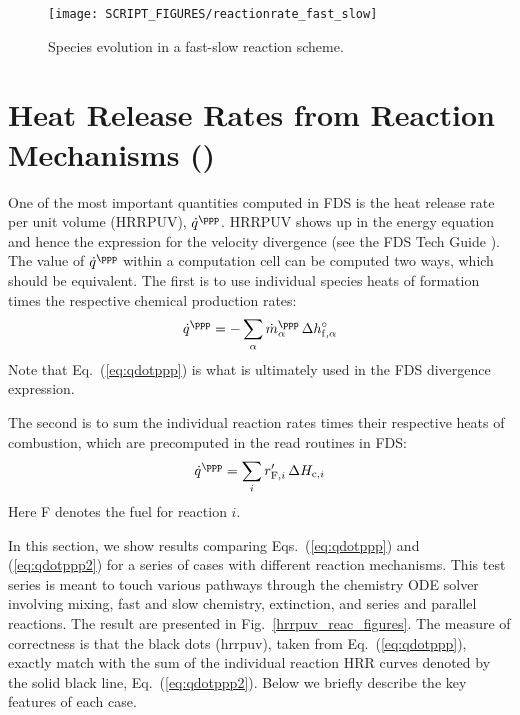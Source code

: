 \documentclass[11pt]{book}
\begin{document}
\begin{figure}[!ht]
\centering
\texttt{[image: SCRIPT\_FIGURES/reactionrate\_fast\_slow]}
\caption[Species evolution in a fast-slow reaction scheme]{Species evolution in a fast-slow reaction scheme.}
\label{fig:reactionrate_fast_slow}
\end{figure}

\FloatBarrier


\section{Heat Release Rates from Reaction Mechanisms ()}
\label{hrrpuv_reac}
\label{hrrpuv_reac_arrhenius}
\label{hrrpuv_reac_extinction}
\label{hrrpuv_reac_parallel}
\label{hrrpuv_reac_parallel_2}
\label{hrrpuv_reac_series}
\label{hrrpuv_reac_simple}
\label{hrrpuv_reac_single}
\label{hrrpuv_reac_soot}

One of the most important quantities computed in FDS is the heat release rate per unit volume (HRRPUV), $\dot{q}^{\ppp}$.  HRRPUV shows up in the energy equation and hence the expression for the velocity divergence (see the FDS Tech Guide \cite{FDS_Math_Guide}).  The value of $\dot{q}^{\ppp}$ within a computation cell can be computed two ways, which should be equivalent.  The first is to use individual species heats of formation times the respective chemical production rates:
\begin{equation}
\label{eq:qdotppp}
\dot{q}^{\ppp} = - \sum_\alpha \dot{m}_\alpha^{\ppp} \, \Delta h_{{\rm f},\alpha}^\circ
\end{equation}
Note that Eq.~(\ref{eq:qdotppp}) is what is ultimately used in the FDS divergence expression.

The second is to sum the individual reaction rates  times their respective heats of combustion, which are precomputed in the read routines in FDS:
\begin{equation}
\label{eq:qdotppp2}
\dot{q}^{\ppp} = \sum_i r_{{\rm F},i}^\prime \, \Delta H_{{\rm c},i}
\end{equation}
Here F denotes the fuel for reaction $i$.

In this section, we show results comparing Eqs.~(\ref{eq:qdotppp}) and (\ref{eq:qdotppp2}) for a series of cases with different reaction mechanisms.  This test series is meant to touch various pathways through the chemistry ODE solver involving mixing, fast and slow chemistry, extinction, and series and parallel reactions.  The result are presented in Fig.~\ref{hrrpuv_reac_figures}.  The measure of correctness is that the black dots (hrrpuv), taken from Eq.~(\ref{eq:qdotppp}), exactly match with the sum of the individual reaction HRR curves denoted by the solid black line, Eq.~(\ref{eq:qdotppp2}). Below we briefly describe the key features of each case.
\end{document}
